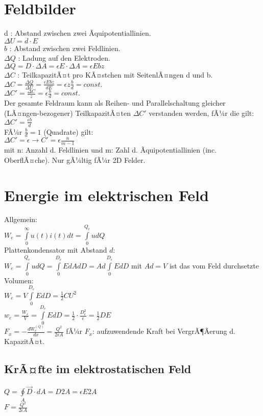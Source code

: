 \documentclass[a4paper,twoside,12pt]{report}
\begin{document}
\section{Feldbilder}
d : Abstand zwischen zwei Ãquipotentiallinien.\\
$\Delta U = d\cdot E$\\
$b$ : Abstand zwischen zwei Feldlinien.\\
$\Delta Q$ : Ladung auf den Elektroden.\\
$\Delta Q = D\cdot \Delta A = \epsilon E\cdot \Delta A = \epsilon Ebz$\\
$\Delta C$ : TeilkapazitÃ¤t pro KÃ¤stchen mit SeitenlÃ¤ngen d und b.\\
$\Delta C = \frac{\Delta Q}{\Delta U} = \frac{\epsilon E b z}{dE} = \epsilon z \frac{b}{d} = const.$\\
$\Delta C' = \frac{\Delta C}{z}= \epsilon \frac{b}{d} = const.$\\
Der gesamte Feldraum kann als Reihen- und Parallelschaltung gleicher (LÃ¤ngen-bezogener) TeilkapazitÃ¤ten $\Delta C'$ verstanden werden, fÃ¼r die gilt:\\
$\Delta C' = \frac{\epsilon b}{d}$\\
FÃ¼r $\frac{b}{d} = 1$ (Quadrate) gilt:\\
$\Delta C' = \epsilon \rightarrow C' = \epsilon \frac{n}{m-1}$\\ 
mit n: Anzahl d. Feldlinien und m: Zahl d. Ãquipotentiallinien (inc. OberflÃ¤che). Nur gÃ¼ltig fÃ¼r 2D Felder.\\

\section{Energie im elektrischen Feld}
Allgemein:\\
$W_e = \int\limits_0^\infty{u(t)i(t)dt} = \int\limits_0^{Q_e}{udQ}$\\
Plattenkondensator mit Abstand $d$:\\
$W_e = \int\limits_0^{Q_e}{udQ} = \int\limits_0^{D_e}{EdAdD} = Ad\int\limits_0^{D_e}{EdD}$ mit $Ad = V$ ist das vom Feld durchsetzte Volumen:\\
$W_e = V \int\limits_0^{D_e}{EdD} = \frac{1}{2} CU^2$\\
$w_e = \frac{W_e}{V} = \int\limits_0^{D_e}{EdD} = \frac{1}{2} \cdot \frac{D_e^2}{\epsilon} = \frac{1}{2} DE$\\
$F_x = -\frac{dW_e^{(Q)}}{dx} = \frac{Q^2}{2\epsilon A}$ fÃ¼r $F_x$: aufzuwendende Kraft bei VergrÃ¶Ãerung d. KapazitÃ¤t.\\

\subsection{KrÃ¤fte im elektrostatischen Feld}
$Q = \oint\limits_A{\vec{D}\cdot dA} = D 2 A = \epsilon E 2 A$\\
$F = \frac{Q^2}{2 \epsilon A}$\\
\end{document}
